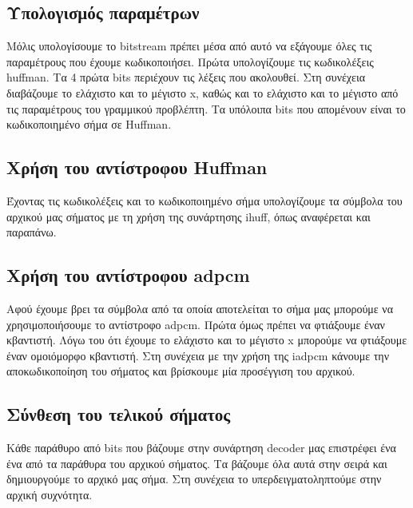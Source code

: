 \subsection{Υπολογισμός παραμέτρων}
\par Μόλις υπολογίσουμε το bitstream πρέπει μέσα από αυτό να εξάγουμε όλες τις 
παραμέτρους που έχουμε κωδικοποιήσει. Πρώτα υπολογίζουμε τις κωδικολέξεις huffman.
Τα 4 πρώτα bits περιέχουν τις λέξεις που ακολουθεί. Στη συνέχεια διαβάζουμε το 
ελάχιστο και το μέγιστο x, καθώς και το ελάχιστο και το μέγιστο από τις παραμέτρους 
του γραμμικού προβλέπτη. Τα υπόλοιπα bits που απομένουν είναι το κωδικοποιημένο 
σήμα σε Huffman.

\subsection{Χρήση του αντίστροφου Huffman}
\par Έχοντας τις κωδικολέξεις και το κωδικοποιημένο σήμα υπολογίζουμε τα σύμβολα 
του αρχικού μας σήματος με τη χρήση της συνάρτησης ihuff, όπως αναφέρεται και 
παραπάνω.

\subsection{Χρήση του αντίστροφου adpcm}
\par Αφού έχουμε βρει τα σύμβολα από τα οποία αποτελείται το σήμα μας μπορούμε να 
χρησιμοποιήσουμε το αντίστροφο adpcm. Πρώτα όμως πρέπει να φτιάξουμε έναν κβαντιστή. 
Λόγω του ότι έχουμε το ελάχιστο και το μέγιστο x μπορούμε να φτιάξουμε έναν ομοιόμορφο 
κβαντιστή. Στη συνέχεια με την χρήση της iadpcm κάνουμε την αποκωδικοποίηση του σήματος 
και βρίσκουμε μία προσέγγιση του αρχικού.

\subsection{Σύνθεση του τελικού σήματος}
\par Κάθε παράθυρο από bits που βάζουμε στην συνάρτηση decoder μας επιστρέφει ένα 
ένα από τα παράθυρα του αρχικού σήματος. Τα βάζουμε όλα αυτά στην σειρά και δημιουργούμε 
το αρχικό μας σήμα. Στη συνέχεια το υπερδειγματοληπτούμε στην αρχική συχνότητα.


